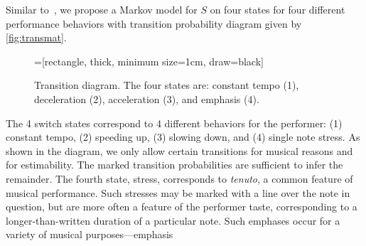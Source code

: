 \documentclass[aoas]{imsart}
\begin{document}
Similar to~\citet{GuRaphael2012}, we propose a Markov model for $S$ on four
states for four different performance behaviors
with transition probability
diagram given by \autoref{fig:transmat}.
\begin{figure}[tb!]
  \centering
  =[rectangle,
  thick, minimum size=1cm, draw=black]
  \caption{Transition diagram. The four states are: constant tempo
    (1), deceleration (2), acceleration (3), and emphasis (4).\label{fig:transmat}}
\end{figure}
The 4 switch states correspond to 4 different behaviors for the
performer: (1) constant tempo, (2) speeding up, (3) slowing down, and
(4) single note stress. As shown in the diagram, we only allow certain
transitions for musical reasons and for estimability. The marked
transition probabilities are sufficient to infer the remainder. The fourth
state, stress, corresponds to {\em tenuto}, a common feature of
musical performance. Such stresses may be marked with a line over the
note in question, but are more often a feature of the performer taste,
corresponding to a longer-than-written duration of a particular
note. Such emphases occur for a variety of musical purposes---emphasis
\end{document}
